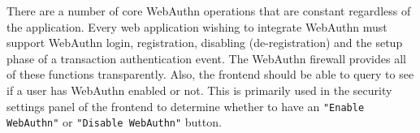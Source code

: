 There are a number of core WebAuthn operations that are constant regardless of the application. Every web application wishing to integrate WebAuthn must support WebAuthn login, registration, disabling (de-registration) and the setup phase of a transaction authentication event. The WebAuthn firewall provides all of these functions transparently. Also, the frontend should be able to query \sys{} to see if a user has WebAuthn enabled or not. This is primarily used in the security settings panel of the frontend to determine whether to  have an \lstinline{"Enable WebAuthn"} or \lstinline{"Disable WebAuthn"} button.











